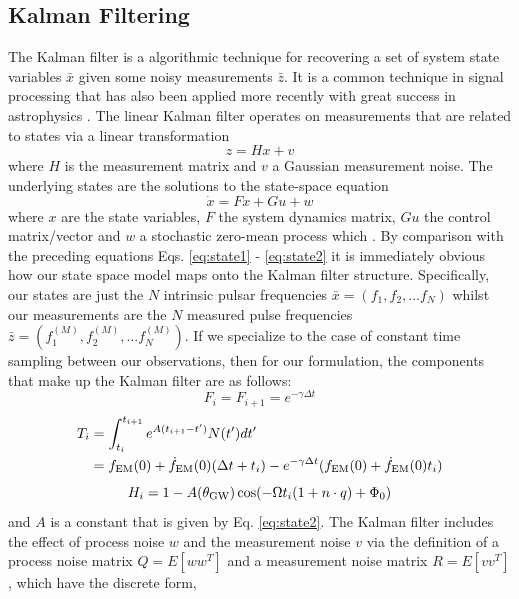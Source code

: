 \documentclass[fleqn,usenatbib,useAMS]{mnras}
\begin{document}
\subsection{Kalman Filtering}\label{sec:kalman_filter}
The Kalman filter \citep{Kalman1} is a algorithmic technique for recovering a set of system state variables $\bar{x}$ given some noisy measurements $\bar{z}$. It is a common technique in signal processing that has also been applied more recently with great success in astrophysics \citep[e.g.][]{Meyers2021,Melatos2023}. The linear Kalman filter operates on measurements that are related to states via a linear transformation
\begin{equation}
	z = Hx + v
\end{equation}
where $H$ is the measurement matrix and $v$ a Gaussian measurement noise. The underlying states are the solutions to the state-space equation 
\begin{equation}
	\dot{x} = Fx + Gu + w
\end{equation}
where $x$ are the state variables, $F$ the system dynamics matrix, $G u$ the control matrix/vector and $w$ a stochastic zero-mean process which .  By comparison with the preceding equations Eqs. 	\ref{eq:state1} - 	\ref{eq:state2} it is immediately obvious how our state space model maps onto the Kalman filter structure. Specifically, our states are just the $N$ intrinsic pulsar frequencies $\bar{x} = (f_1,f_2,...f_N)$ whilst our measurements are the $N$ measured pulse frequencies $\bar{z} = (f^{(M)}_1,f^{(M)}_2,...f^{(M)}_N)$. If we specialize to the case of constant time sampling between our observations, then for our formulation, the components that make up the Kalman filter are as follows: 
\begin{equation}
	F_i = F_{i+1} = e^{-\gamma \Delta t}
\end{equation}
\begin{align}
	T_i &= \int_{t_i}^{t_{i+1}}  e^{A (t_{i+1} - t')} N(t') dt' \\
	    & = f_{\rm EM}(0) + \dot{f}_{\rm EM}(0)  (\Delta t + t_i) - e^{-\gamma \Delta t} (f_{\rm EM}(0) + \dot{f}_{\rm EM}(0)t_i)
\end{align}
\begin{equation}
	H_i = 1 -A(\theta_{\rm GW}) \cos(-\Omega t_i (1 + n\cdot q ) + \Phi_0)
\end{equation}
and $A$ is a constant that is given by  Eq. \ref{eq:state2}. The Kalman filter includes the effect of process noise $w$ and the measurement noise $v$ via the definition of a process noise matrix $Q = E[w w^T]$ and a measurement noise matrix $R = E[v v^T]$, which have the discrete form,
\end{document}
